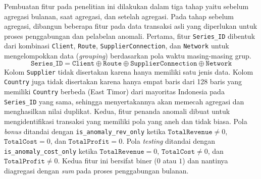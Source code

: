 Pembuatan fitur pada penelitian ini dilakukan dalam tiga tahap yaitu sebelum agregasi bulanan, saat agregasi, dan setelah agregasi. Pada tahap sebelum agregasi, dibangun beberapa fitur pada data transaksi asli yang diperlukan untuk proses penggabungan dan pelabelan anomali.
Pertama, fitur \texttt{Series\_ID} dibentuk dari kombinasi \texttt{Client}, \texttt{Route}, \texttt{SupplierConnection}, dan \texttt{Network} untuk mengelompokkan data (\textit{grouping}) berdasarkan pola waktu masing-masing grup.
\begin{equation}
\texttt{Series\_ID} = \texttt{Client} \oplus \texttt{Route} \oplus \texttt{SupplierConnection} \oplus \texttt{Network}
\end{equation}
\noindent Kolom \texttt{Supplier} tidak disertakan karena hanya memiliki satu jenis data. Kolom \texttt{Country} juga tidak disertakan karena hanya empat baris dari 128 baris yang memiliki \texttt{Country} berbeda (East Timor) dari mayoritas Indonesia pada \texttt{Series\_ID} yang sama, sehingga menyertakannya akan memecah agregasi dan menghasilkan nilai duplikat.
Kedua, fitur penanda anomali dibuat untuk mengidentifikasi transaksi yang memiliki pola yang aneh dan tidak biasa. Pola \textit{bonus} ditandai dengan \texttt{is\_anomaly\_rev\_only} ketika $\texttt{TotalRevenue} \neq 0$, $\texttt{TotalCost} = 0$, dan $\texttt{TotalProfit} = 0$. Pola \textit{testing} ditandai dengan \texttt{is\_anomaly\_cost\_only} ketika $\texttt{TotalRevenue} = 0$, $\texttt{TotalCost} \neq 0$, dan $\texttt{TotalProfit} \neq 0$. Kedua fitur ini bersifat biner ($0$ atau $1$) dan nantinya diagregasi dengan \textit{sum} pada proses penggabungan bulanan.

